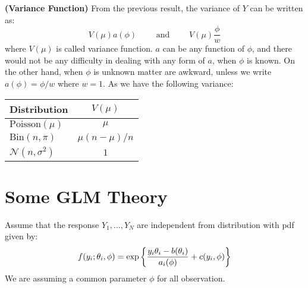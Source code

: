 \begin{definition}{\textbf{(Variance Function)}}
    From the previous result, the variance of $Y$ can be written as:
    \begin{equation*}
        V(\mu)a(\phi) \qquad \text{ and } \qquad V(\mu)\frac{\phi}{w}
    \end{equation*}
    where $V(\mu)$ is called variance function. $a$ can be any function of $\phi$, and there would not be any difficulty in dealing with any form of $a$, when $\phi$ is known. On the other hand, when $\phi$ is unknown matter are awkward, unless we write $a(\phi) = \phi/w$ where $w=1$. As we have the following variance:
    \begin{table}[H]
    \centering
    \begin{tabular}{lc}
        \toprule
        \textbf{Distribution}   & $V(\mu)$  \\
        \midrule
        $\text{Poisson}(\mu)$ & $\mu$ \\
        $\text{Bin}(n,\pi)$ & $\mu(n-\mu)/n$ \\
        $\mathcal{N}(n,\sigma^2)$ & $1$ \\
        \bottomrule
    \end{tabular}
    \end{table}
\end{definition}

\section{Some GLM Theory}

\begin{remark}
    Assume that the response $Y_1,\dots,Y_N$ are independent from distribution with pdf given by:
    \begin{equation*}
        f(y_i ; \theta_i, \phi) = \exp\left\{ \frac{y_i\theta_i - b(\theta_i)}{a_i(\phi)}+ c(y_i, \phi) \right\}
    \end{equation*}
    We are assuming a common parameter $\phi$ for all observation. 
\end{remark}

